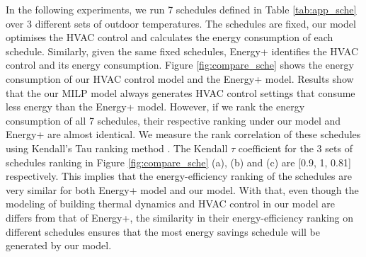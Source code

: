 In the following experiments, we run 7 schedules defined in Table \ref{tab:app_sche} over 3 different sets of outdoor temperatures. The schedules are fixed, our model optimises the HVAC control and calculates the energy consumption of each schedule. Similarly, given the same fixed schedules, Energy+ identifies the HVAC control and its energy consumption. Figure \ref{fig:compare_sche} shows the energy consumption of our HVAC control model and the Energy+ model. Results show that the our MILP model always generates HVAC control settings that consume less energy than the Energy+ model. However, if we rank the energy consumption of all 7 schedules, their respective ranking under our model and Energy+ are almost identical. We measure the rank correlation of these schedules using Kendall's Tau ranking method \citep{daniel1990applied}. The Kendall $\tau$ coefficient for the 3 sets of schedules ranking in Figure \ref{fig:compare_sche} (a), (b) and (c) are [0.9, 1, 0.81] respectively. This implies that the energy-efficiency ranking of the schedules are very similar for both Energy+ model and our model. With that, even though the modeling of building thermal dynamics and HVAC control in our model are differs from that of Energy+, the similarity in their energy-efficiency ranking on different schedules ensures that the most energy savings schedule will be generated by our model. 

